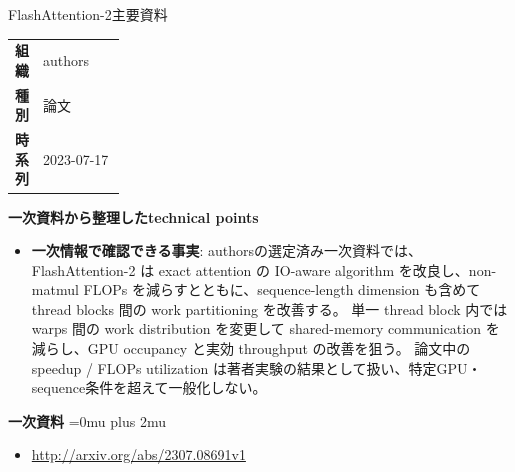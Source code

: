 \begin{technicalnote}{FlashAttention-2}{主要資料}
\begingroup
\begin{tabularx}{\linewidth}{@{}>{\bfseries}p{0.22\linewidth}X@{}}
組織 & authors \\
種別 & 論文 \\
時系列 & 2023-07-17 \\
\end{tabularx}
\smallskip
{\bfseries 一次資料から整理したtechnical points}
\begin{itemize}[leftmargin=1.5em,itemsep=0.35em]
\item \textbf{一次情報で確認できる事実}: authorsの選定済み一次資料では、FlashAttention-2 は exact attention の IO-aware algorithm を改良し、non-matmul FLOPs を減らすとともに、sequence-length dimension も含めて thread blocks 間の work partitioning を改善する。 単一 thread block 内では warps 間の work distribution を変更して shared-memory communication を減らし、GPU occupancy と実効 throughput の改善を狙う。 論文中の speedup / FLOPs utilization は著者実験の結果として扱い、特定GPU・sequence条件を超えて一般化しない。
\end{itemize}
\begin{minipage}{\linewidth}
\begin{samepage}
{\bfseries 一次資料}
\begingroup\sloppy
\Urlmuskip=0mu plus 2mu\relax
\begin{itemize}[leftmargin=1.5em,itemsep=0.25em]
\item {\scriptsize\url{http://arxiv.org/abs/2307.08691v1}}
\end{itemize}
\endgroup
\end{samepage}
\end{minipage}
\endgroup
\end{technicalnote}
\medskip

